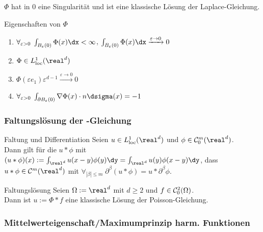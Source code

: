 \begin{Bem}
    $\Phi$ hat in $0$ eine Singularität und ist eine klassische Lösung der Laplace-Gleichung.
\end{Bem}

\linie

\begin{Lemma}{Eigenschaften von $\Phi$}
    \begin{enumerate}
        \item
        $\forall_{\varepsilon>0}\; \int_{B_\varepsilon(0)} \Phi(x)\dx < \infty$,\quad
        $\int_{B_\varepsilon(0)} \Phi(x)\dx \xrightarrow{\varepsilon \to 0} 0$

        \item
        $\Phi \in L^1_\loc(\real^d)$

        \item
        $\Phi(\varepsilon e_1) \varepsilon^{d-1} \xrightarrow{\varepsilon \to 0} 0$

        \item
        $\forall_{\varepsilon>0}\;
        \int_{\partial B_\varepsilon(0)} \nabla\Phi(x) \cdot n\dsigma(x) = -1$
    \end{enumerate}
\end{Lemma}

\subsubsection{%
    Faltungslösung der -Gleichung%
}

\begin{Satz}{Faltung und Dif{}ferentiation}
    Seien $u \in L^1_\loc(\real^d)$ und $\phi \in \C^m_0(\real^d)$.\\
    Dann gilt für die  $u \ast \phi$ mit
    $(u \ast \phi)(x) := \int_{\real^d} u(x-y)\phi(y) \dy
    = \int_{\real^d} u(y)\phi(x-y) \dy$, dass
    $u \ast \phi \in \C^m(\real^d)$ mit
    $\forall_{|\beta| \le m}\; \partial^\beta (u \ast \phi) = u \ast \partial^\beta \phi$.
\end{Satz}

\begin{Satz}{Faltungslösung}
    Seien $\Omega := \real^d$ mit $d \ge 2$ und $f \in \mathcal{C}^2_0(\Omega)$.\\
    Dann ist $u := \Phi \ast f$ eine klassische Lösung der Poisson-Gleichung.
\end{Satz}

\pagebreak

\subsubsection{%
    Mittelwerteigenschaft/Maximumprinzip harm. Funktionen%
}

